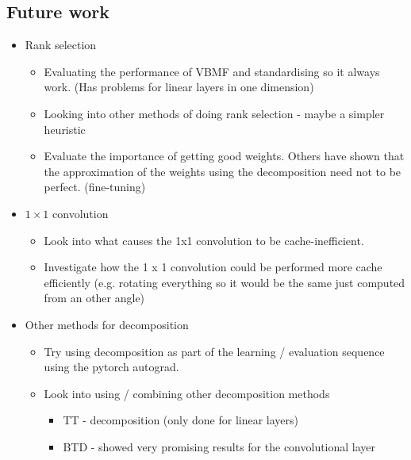 \subsection{Future work}
\begin{itemize}
    \item Rank selection
    \begin{itemize}
    \item Evaluating the performance of VBMF and standardising so it always work. (Has problems for linear layers in one dimension)
	\item Looking into other methods of doing rank selection - maybe a simpler heuristic
	\item Evaluate the importance of getting good weights. Others have shown that the approximation of the weights using the decomposition need not to be perfect. (fine-tuning)
    \end{itemize}
    \item $1\times 1$ convolution
    \begin{itemize}
        \item  Look into what causes the 1x1 convolution to be cache-inefficient.
	    \item Investigate how the 1 x 1 convolution could be performed more cache efficiently (e.g. rotating everything so it would be the same just computed from an other angle)
    \end{itemize}
    \item Other methods for decomposition
    \begin{itemize}
        \item Try using decomposition as part of the learning / evaluation sequence using the pytorch autograd. 
        \item Look into using / combining other decomposition methods
        \begin{itemize}
            \item TT - decomposition (only done for linear layers)
		    \item BTD - showed very promising results for the convolutional layer
        \end{itemize}
    \end{itemize}
\end{itemize}